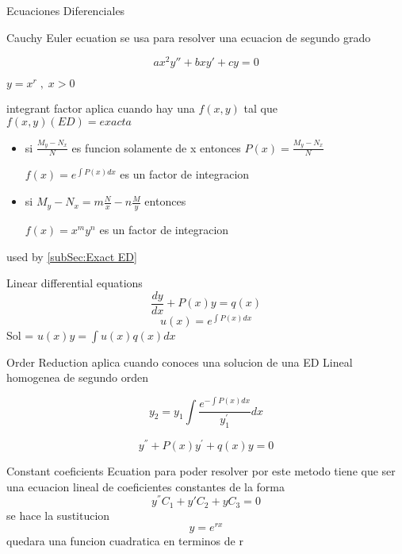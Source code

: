 \begin{section}{Ecuaciones Diferenciales}
	\begin{subsection}{Cauchy Euler ecuation}
		se usa para resolver una ecuacion de segundo grado
	
	
		$$ax^2y'' + bxy' + cy = 0$$
		\begin{center}
		$y = x^r \;, \; x > 0 $
		\end{center}
	\end{subsection}
	
	\begin{subsection}{integrant factor}
	aplica cuando hay una $f(x,y) $ tal que $f(x,y)(ED) = exacta$
	
	\begin{itemize}
		\item si $ \frac{M_y - N_x}{N}$ es funcion solamente de x entonces $P(x) = \frac{M_y - N_x}{N}$
			\begin{center}
		$f(x) = e^{\int P(x)dx}$ es un factor de integracion
			\end{center}
	
		\item si $M_y - N_x = m\frac{N}{x} - n\frac{M}{y}$ entonces
			\begin{center}
				$f(x) = x^my^n$ es un factor de integracion
			\end{center}
	
	\end{itemize}
		\label{subSec:integrant factor}
		used by \autoref{subSec:Exact ED}{}
	
	\end{subsection}
	\begin{subsection}{Linear differential equations}
		$$\frac{dy}{dx} + P(x)y = q(x) $$
		$$u(x) = e^{\int P(x) dx }$$
		Sol =  $u(x)y = \int u(x)q(x)dx$
	
	\end{subsection}
	\begin{subsection}{Order Reduction}
		aplica cuando conoces una solucion de una ED Lineal homogenea de segundo orden
		
		$$y_2 = y_1 \int \frac{e^{- \int P(x) dx }}{y_1^{'}} dx $$
		
		$$y^{''} + P(x)y^{'} + q(x)y = 0$$
	\end{subsection}
	\newpage
	\begin{subsection}{Constant coeficients Ecuation}
		para poder resolver por este metodo tiene que ser una ecuacion lineal de coeficientes constantes
		de la forma $$y^{''}C_1 + y{'}C_2 + yC_3 = 0$$
		se hace la sustitucion $$y=e^{rx}$$ quedara una funcion cuadratica en terminos de r
		

\end{subsection}
\end{section}
